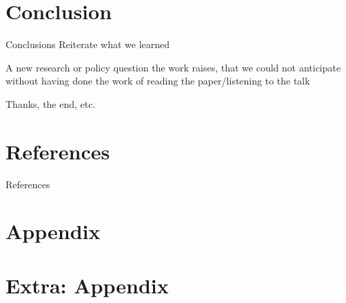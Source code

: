 \documentclass[aspectratio=169, 11pt]{beamer}
\begin{document}
\section{Conclusion}

\begin{frame}{Conclusions}
    Reiterate what we learned
    
    A new research or policy question the work raises, that we could not anticipate without having done the work of reading the paper/listening to the talk
\end{frame}

\begin{frame}
    \begin{center}
        \LARGE Thanks, the end, etc.
    \end{center}
\end{frame}

\AtBeginSection[]{}


\section{References}

\appendix

\begin{frame}[allowframebreaks]{References}
\begin{scriptsize}
    \printbibliography
\end{scriptsize}
\end{frame}

\section{Appendix}


\section{Extra: Appendix}
\end{document}
